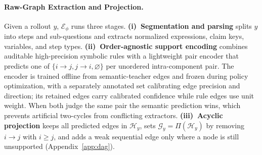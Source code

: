 \paragraph{Raw-Graph Extraction and Projection.}
Given a rollout $y$, $\mathcal{E}_{\phi}$ runs three stages. \textbf{(i)~Segmentation and parsing} splits $y$ into steps and sub-questions and extracts normalized expressions, claim keys, variables, and step types. \textbf{(ii)~Order-agnostic support encoding} combines auditable high-precision symbolic rules with a lightweight pair encoder that predicts one of $\{i\!\to\!j,j\!\to\!i,\varnothing\}$ per unordered intra-component pair. The encoder is trained offline from semantic-teacher edges and frozen during policy optimization, with a separately annotated set calibrating edge precision and direction; its retained edges carry calibrated confidence while rule edges use unit weight. When both judge the same pair the semantic prediction wins, which prevents artificial two-cycles from conflicting extractors. \textbf{(iii)~Acyclic projection} keeps all predicted edges in $\mathcal{H}_y$, sets $\mathcal{G}_y=\Pi(\mathcal{H}_y)$ by removing $i\!\to\!j$ with $i\ge j$, and adds a weak sequential edge only where a node is still unsupported (Appendix~\ref{app:dag}).

